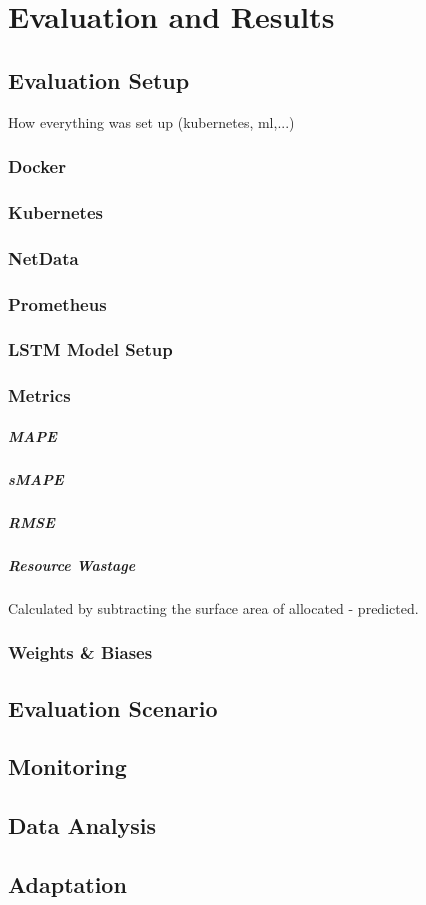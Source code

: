 \chapter{Evaluation and Results}

\section{Evaluation Setup}
  How everything was set up (kubernetes, ml,...)
  
  \subsection{Docker}
  \subsection{Kubernetes}
  \subsection{NetData}
  \subsection{Prometheus}
  \subsection{LSTM Model Setup}
  \subsection{Metrics}

    \paragraph{MAPE}
    \paragraph{sMAPE}
    \paragraph{RMSE}
    \paragraph{Resource Wastage}
      Calculated by subtracting the surface area of allocated - predicted.
  \subsection{Weights \& Biases}
\section{Evaluation Scenario}
\section{Monitoring}
\section{Data Analysis}
\section{Adaptation}
